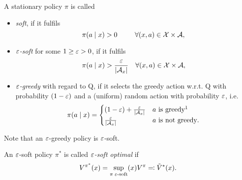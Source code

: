 \begin{definition}
	A stationary policy \(\pi\) is called 
	\begin{itemize}[font=\normalfont]
		\item \emph{soft}, if it fulfils 
		\[
			\pi(a\mid x)>0 \qquad\;\; \forall (x,a)\in\mathcal{X}\times\mathcal{A},
		\]
		\item \emph{\(\varepsilon\)-soft} for some \(1\ge \varepsilon>0\), if it fulfils 
		\[
			\pi(a\mid x)>\frac{\varepsilon}{|\mathcal{A}_x|} \quad \forall (x,a)\in\mathcal{X}\times\mathcal{A},
		\]
		\item \emph{\(\varepsilon\)-greedy} with regard to Q, if it selects the greedy action w.r.t. Q with probability \((1-\varepsilon)\) and a (uniform) random action with probability \(\varepsilon\), i.e. \[\pi(a\mid x)=
			\begin{cases}
				(1-\vep)+ \frac{\vep}{|\cA_x|} & a \text{ is greedy\footnotemark[1]}\\
				\frac{\vep}{|\cA_x|} & a \text{ is not greedy}.
			\end{cases}
		\]
	\end{itemize}
	Note that an \(\varepsilon\)-greedy policy is \(\varepsilon\)-soft.

	An \(\varepsilon\)-soft policy \(\pi^*\) is called \emph{\(\varepsilon\)-soft optimal} if 
	\[
		V^{\pi^*}(x)=\sup_{\pi\; \varepsilon\text{-soft}}(x) V^\pi \eqqcolon \tilde{V}^*(x).
	\]
\end{definition}

